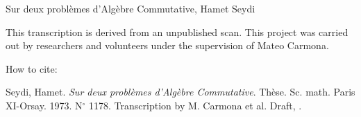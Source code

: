 \documentclass[12pt,twoside]{report} %
\theoremstyle{plain}
\theoremstyle{definition}
\begin{document}
\newpage 
\thispagestyle{empty}

\begin{center}
Sur deux problèmes d'Algèbre Commutative, Hamet Seydi
\end{center}

\vspace*{\fill}

This transcription is derived from an unpublished scan. This project was carried out by researchers and volunteers under the supervision of Mateo Carmona.

\bigskip

How to cite:

Seydi, Hamet. \emph{Sur deux problèmes d'Algèbre Commutative}. Thèse. Sc. math. Paris XI-Orsay. 1973. N$^\circ$ 1178. Transcription by M. Carmona et al. Draft, \monthname[\the\month] \the\year.

\newpage
\thispagestyle{empty}
\mbox{}


\renewcommand{\contentsname}{SOMMAIRE}
\tableofcontents\thispagestyle{empty}





\newpage
\mbox{}
\thispagestyle{empty}
\end{document}

